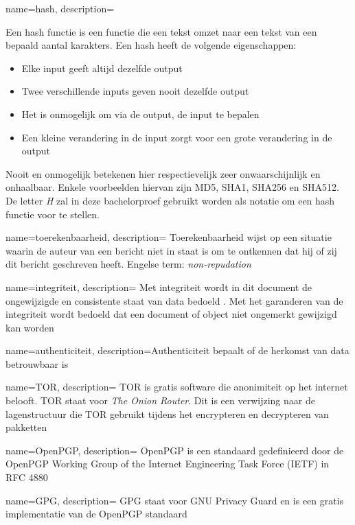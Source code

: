 {
	name={hash},
	description={
		Een hash functie is een functie die een tekst omzet naar een
		tekst van een bepaald aantal karakters. Een hash heeft de volgende
		eigenschappen:
		\begin{itemize}
			\item Elke input geeft altijd dezelfde output
			\item Twee verschillende inputs geven nooit dezelfde output
			\item Het is onmogelijk om via de output, de input te bepalen
			\item Een kleine verandering in de input zorgt voor een grote
			verandering in de output
		\end{itemize}
		Nooit en onmogelijk betekenen hier respectievelijk zeer
		onwaarschijnlijk en onhaalbaar.
		Enkele voorbeelden hiervan zijn MD5, SHA1, SHA256 en SHA512. \\
		De letter \textit{H} zal in deze bachelorproef gebruikt worden als
		notatie om een hash functie voor te stellen.}
}

{
	name={toerekenbaarheid},
	description={
		Toerekenbaarheid wijst op een situatie waarin de auteur van een bericht
		niet in staat is om te ontkennen dat hij of zij dit bericht
		geschreven heeft. Engelse term: \textit{non-repudation}}
}

{
	name={integriteit},
	description={
		Met integriteit wordt in dit document de ongewijzigde en
		consistente staat van data bedoeld \autocite{Boritz2005}. Met het
		garanderen van de integriteit wordt bedoeld dat een document
		of object niet ongemerkt gewijzigd kan worden}
}

{
	name={authenticiteit},
	description={Authenticiteit bepaalt of de herkomst van data betrouwbaar is}
}

{
	name={TOR},
	description={
		TOR is gratis software die anonimiteit op het internet belooft. TOR
		staat voor \textit{The Onion Router}. Dit is een verwijzing naar de
		lagenstructuur die TOR gebruikt tijdens het encrypteren en decrypteren
		van pakketten}
}

{
	name={OpenPGP},
	description={
		OpenPGP is een standaard gedefinieerd door de OpenPGP Working Group of the Internet Engineering Task Force (IETF) in RFC 4880}
}


{
	name={GPG},
	description={
		GPG staat voor GNU Privacy Guard en is een gratis implementatie van de OpenPGP standaard}
}






